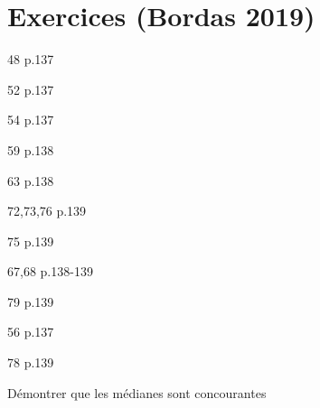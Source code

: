 \documentclass[10pt,a4paper,openany,twoside,prof]{book}
\begin{document}


\newpage

\section*{Exercices (Bordas 2019)}
\addfootnotes

\begin{bookexo}{48 p.137}\end{bookexo}
\begin{bookexo}{52 p.137}\end{bookexo}
\begin{bookexo}{54 p.137}\end{bookexo}
\begin{bookexo}{59 p.138}\end{bookexo}

\begin{bookexo}{63 p.138}\end{bookexo}
\begin{bookexos}{72,73,76 p.139}\end{bookexos}
\begin{bookexo}{75 p.139 \train}\end{bookexo}


\begin{bookexos}{67,68 p.138-139}\end{bookexos}
\begin{bookexo}{79 p.139}\end{bookexo}

\begin{bookexo}{56 p.137}\end{bookexo}
\begin{bookexo}{78 p.139}\end{bookexo}

\begin{exo}{Démontrer que les médianes sont concourantes}\end{exo}
\end{document}
